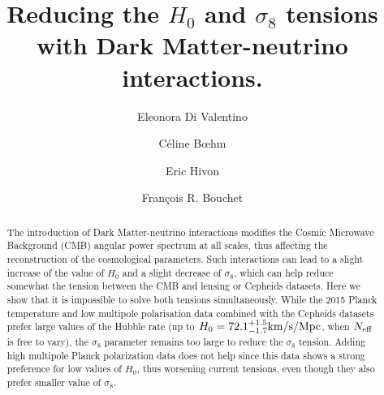 \documentclass[aps,prd,a4paper,twocolumn,amsmath,showpacs,superscriptaddress,nofootinbib,preprintnumbers]{revtex4-1}
\begin{document}
\title{ Reducing the $H_0$ and $\sigma_8$ tensions with Dark Matter-neutrino interactions.}  



\author{Eleonora Di Valentino}
\author{C\'eline B\oe hm} 
\author{Eric Hivon} 
\author{Fran\c cois R. Bouchet} 



\preprint{}
\begin{abstract}
The introduction of Dark Matter-neutrino interactions modifies the Cosmic Microwave Background (CMB) angular power spectrum at all scales, thus affecting the reconstruction of the cosmological parameters. Such interactions can lead to a slight increase of the value of $H_0$ and a slight decrease of $\sigma_8$, which can help reduce somewhat the tension between the CMB and lensing or Cepheids datasets. Here we show that it is impossible to solve both tensions simultaneously. While the 2015 Planck temperature and low multipole polarisation data combined with the Cepheids datasets prefer large values of the Hubble rate (up to $H_0 = 72.1^{+1.5}_{-1.7} \rm{km/s/Mpc}$, when $N_{\rm{eff}}$ is free to vary), the $\sigma_8$ parameter remains too large to reduce the $\sigma_8$ tension. Adding high multipole Planck polarization data does not help since this data shows a strong preference for low values of $H_0$, thus worsening current tensions, even though they also prefer smaller value of $\sigma_8$. %
\end{abstract}
\maketitle
\end{document}
